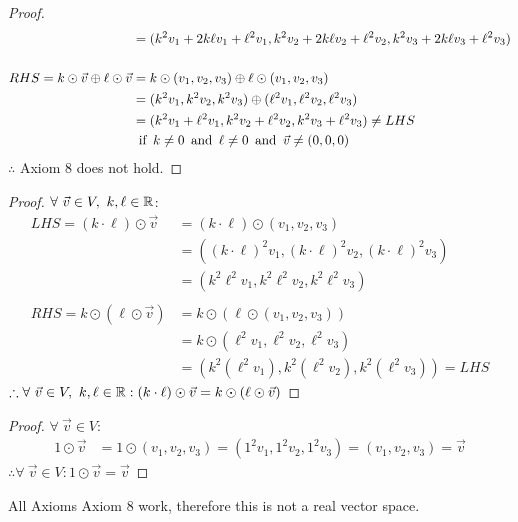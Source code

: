 \begin{enumerate}
\begin{proof}
\begin{align*}
                                                      & = (k^2v_1+2k\ell v_1+\ell^2v_1,k^2v_2+2k\ell v_2+\ell^2v_2,k^2v_3+2k\ell v_3+\ell^2v_3) \\ \\
      RHS = k \odot \vec{v} \oplus \ell \odot \vec{v} & = k \odot (v_1,v_2,v_3) \oplus \ell \odot (v_1,v_2,v_3)                                 \\
                                                      & = (k^2v_1,k^2v_2,k^2v_3) \oplus (\ell^2v_1,\ell^2v_2,\ell^2v_3)                         \\
                                                      & = (k^2v_1 + \ell^2v_1, k^2v_2 + \ell^2v_2, k^2v_3 + \ell^2v_3) \neq LHS                 \\
                                                      & \operatorname{~\text{if}~} k \neq 0 \operatorname{~\text{and}~} \ell \neq 0 \operatorname{~\text{and}~} \vec{v} \neq (0,0,0)
    \end{align*}
    $\therefore$ Axiom 8 does not hold.
  \end{proof}
  \begin{proof}
    $\forall~\vec{v} \in V,~k,\ell \in \mathbb{R}$:
    \begin{align*}
      LHS = (k \cdot \ell) \odot \vec{v} & = (k \cdot \ell) \odot (v_1,v_2,v_3)                              \\
                                         & = ((k \cdot \ell)^2v_1, (k \cdot \ell)^2v_2, (k \cdot \ell)^2v_3) \\
                                         & = (k^2\ell^2v_1,k^2\ell^2v_2,k^2\ell^2v_3)                        \\ \\
      RHS = k \odot (\ell \odot \vec{v}) & = k \odot (\ell \odot (v_1,v_2,v_3))                              \\
                                         & = k \odot (\ell^2v_1,\ell^2v_2,\ell^2v_3)                         \\
                                         & = (k^2(\ell^2v_1),k^2(\ell^2v_2),k^2(\ell^2v_3)) = LHS
    \end{align*}
    $\therefore \forall~\vec{v} \in V,~k,\ell \in \mathbb{R}: (k \cdot \ell) \odot \vec{v} = k \odot (\ell \odot \vec{v})$
  \end{proof}
  \begin{proof}
    $\forall~\vec{v} \in V$:
    \begin{align*}
      1 \odot \vec{v} & = 1 \odot (v_1,v_2,v_3) = (1^2v_1,1^2v_2,1^2v_3) = (v_1,v_2,v_3) = \vec{v}
    \end{align*}
    $\therefore \forall~\vec{v} \in V: 1 \odot \vec{v} = \vec{v}$
  \end{proof}
\end{enumerate}
All Axioms  Axiom 8 work, therefore this is not a real vector space.

